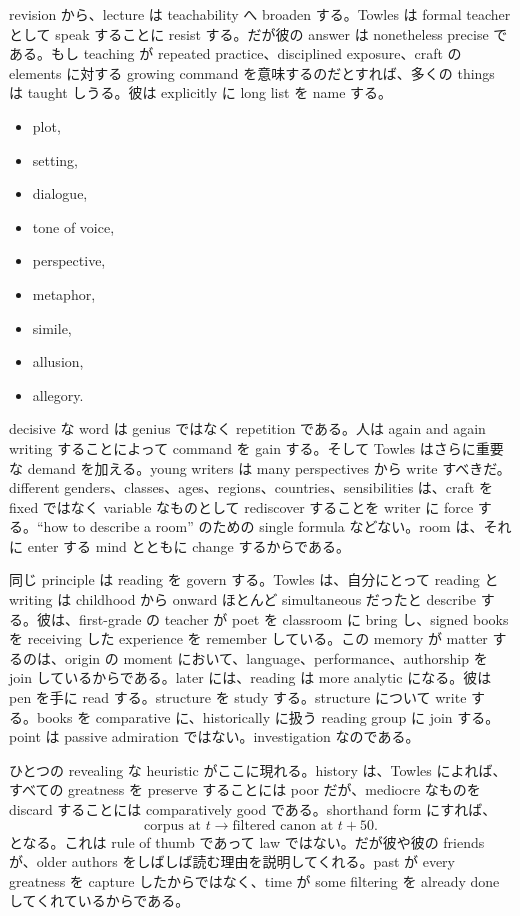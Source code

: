 revision から、lecture は teachability へ broaden する。Towles は formal teacher として speak することに resist する。だが彼の answer は nonetheless precise である。もし teaching が repeated practice、disciplined exposure、craft の elements に対する growing command を意味するのだとすれば、多くの things は taught しうる。彼は explicitly に long list を name する。
\begin{itemize}
\item plot,
\item setting,
\item dialogue,
\item tone of voice,
\item perspective,
\item metaphor,
\item simile,
\item allusion,
\item allegory.
\end{itemize}
decisive な word は genius ではなく repetition である。人は again and again writing することによって command を gain する。そして Towles はさらに重要な demand を加える。young writers は many perspectives から write すべきだ。different genders、classes、ages、regions、countries、sensibilities は、craft を fixed ではなく variable なものとして rediscover することを writer に force する。``how to describe a room'' のための single formula などない。room は、それに enter する mind とともに change するからである。

同じ principle は reading を govern する。Towles は、自分にとって reading と writing は childhood から onward ほとんど simultaneous だったと describe する。彼は、first-grade の teacher が poet を classroom に bring し、signed books を receiving した experience を remember している。この memory が matter するのは、origin の moment において、language、performance、authorship を join しているからである。later には、reading は more analytic になる。彼は pen を手に read する。structure を study する。structure について write する。books を comparative に、historically に扱う reading group に join する。point は passive admiration ではない。investigation なのである。

ひとつの revealing な heuristic がここに現れる。history は、Towles によれば、すべての greatness を preserve することには poor だが、mediocre なものを discard することには comparatively good である。shorthand form にすれば、
\begin{equation}
\text{corpus at } t \longrightarrow \text{filtered canon at } t+50.
\end{equation}
となる。これは rule of thumb であって law ではない。だが彼や彼の friends が、older authors をしばしば読む理由を説明してくれる。past が every greatness を capture したからではなく、time が some filtering を already done してくれているからである。

